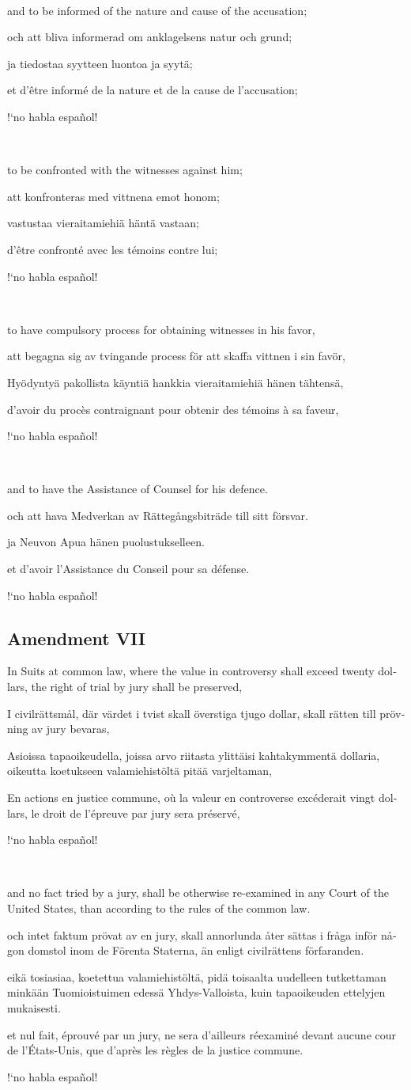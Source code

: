 \documentclass[a4paper,landscape,10pt]{article}
\newcommand{\tblock}[5]{\noindent\begin{minipage}[t]{0.18\textwidth}\foreignlanguage{english}{#1}\end{minipage}\hskip 0.025\textwidth\begin{minipage}[t]{0.18\textwidth}\foreignlanguage{swedish}{#2}\end{minipage}\hskip 0.025\textwidth\begin{minipage}[t]{0.18\textwidth}\foreignlanguage{finnish}{#3}\end{minipage}\hskip 0.025\textwidth\begin{minipage}[t]{0.18\textwidth}\foreignlanguage{french}{#4}\end{minipage}\hskip 0.025\textwidth\begin{minipage}[t]{0.18\textwidth}\foreignlanguage{spanish}{#5}\end{minipage}}
\begin{document}
~

\tblock
{and to be informed of the nature and cause of the accusation;}
{och att bliva informerad om anklagelsens natur och grund;}
{ja tiedostaa syytteen luontoa ja syytä;}
{et d'être informé de la nature et de la cause de l'accusation;}
{!`no habla español!}

~

\tblock
{to be confronted with the witnesses against him;}
{att konfronteras med vittnena emot honom;}	
{vastustaa vieraitamiehiä häntä vastaan;}
{d'être confronté avec les témoins contre lui;}
{!`no habla español!}

~

\tblock
{to have compulsory process for obtaining witnesses in his favor,}
{att begagna sig av tvingande process för att skaffa vittnen i sin favör,}
{Hyödyntyä pakollista käyntiä hankkia vieraitamiehiä hänen tähtensä,}
{d'avoir du procès contraignant pour obtenir des témoins à sa faveur,}
{!`no habla español!}

~

\tblock
{and to have the Assistance of Counsel for his defence.}
{och att hava Medverkan av Rättegångsbiträde till sitt försvar.}
{ja Neuvon Apua hänen puolustukselleen.}
{et d'avoir l'Assistance du Conseil pour sa défense.}
{!`no habla español!}


\subsection*{Amendment VII}
\tblock
{In Suits at common law, where the value in controversy shall exceed twenty dollars, the right of trial by jury shall be preserved,}
{I civilrättsmål, där värdet i tvist skall överstiga tjugo dollar, skall rätten till prövning av jury bevaras,}
{Asioissa tapaoikeudella, joissa arvo riitasta ylittäisi kahtakymmentä dollaria, oikeutta koetukseen valamiehistöltä pitää varjeltaman,}
{En actions en justice commune, où la valeur en controverse excéderait vingt dollars, le droit de l'épreuve par jury sera préservé,}
{!`no habla español!}

~

\tblock
{and no fact tried by a jury, shall be otherwise re-examined in any Court of the United States, than according to the rules of the common law.}
{och intet faktum prövat av en jury, skall annorlunda åter sättas i fråga inför någon domstol inom de Förenta Staterna, än enligt civilrättens förfaranden.}
{eikä tosiasiaa, koetettua valamiehistöltä, pidä toisaalta uudelleen tutkettaman minkään Tuomioistuimen edessä Yhdys-Valloista, kuin tapaoikeuden ettelyjen mukaisesti.}
{et nul fait, éprouvé par un jury, ne sera d'ailleurs réexaminé devant aucune cour de l'États-Unis, que d'après les règles de la justice commune.}
{!`no habla español!}
\end{document}
